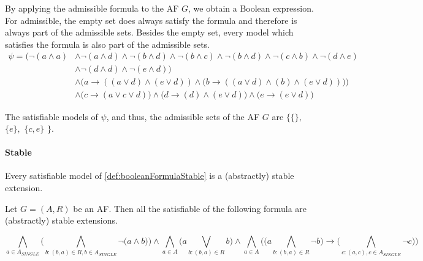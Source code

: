 \begin{example}
By applying the admissible formula to the AF $G$, we obtain a Boolean expression. For admissible, the empty set does always satisfy the formula and therefore is always part of the admissible sets. Besides the empty set, every model which satisfies the formula is also part of the admissible sets.
\begin{align*}
    \psi = \big(
    \lnot (a \land a)
    & \land \lnot (a \land d) \land \lnot (b \land d) \land \lnot (b \land c) \land \lnot (b \land d) \land \lnot (c \land b) \land \lnot (d \land e) \\
    & \land \lnot (d \land d) \land \lnot (e \land d) \big) \\
    & \land \bigl( a \rightarrow ((a \lor d) \land (e \lor d)) \land \bigl( b \rightarrow ((a \lor d) \land (b) \land (e \lor d)) \bigl) \bigl)\\
    & \land \bigl( c \rightarrow (a \lor c \lor d) \bigl) \land \bigl( d \rightarrow (d) \land (e \lor d) \bigl) \land \bigl( e \rightarrow (e \lor d) \bigl)
\end{align*}

The satisfiable models of $\psi$, and thus, the admissible sets of the AF $G$ are $\big\{ \{\},$ $\{e\},$ $\{c, e\}$ $\big\}$.
\end{example}



\paragraph{Stable} Every satisfiable model of \cref{def:booleanFormulaStable} is a (abstractly) stable extension.


\begin{definition}
    Let $G=(A,R)$ be an AF. Then all the satisfiable of the following formula are (abstractly) stable extensions.
    \begin{center}
        \[
        \bigwedge_{a \in A_{\!S\!I\!N\!G\!L\!E}} \big( \bigwedge_{b:(b,a)\in R, b \in A_{\!S\!I\!N\!G\!L\!E}} \lnot \big( a \wedge b \big) \big) \land \bigwedge_{a \in A} \big( a \bigvee_{b:(b,a)\in R} b\big) \land \bigwedge_{a \in A} \big( \big(  a \bigwedge_{b:(b,a) \in R} \lnot b\big)  \rightarrow \big( \bigwedge_{c:(a,c), c \in A_{\!S\!I\!N\!G\!L\!E}} \lnot c\big) \big)
        \]
    \end{center}
    \label{def:booleanFormulaStable}
\end{definition}


